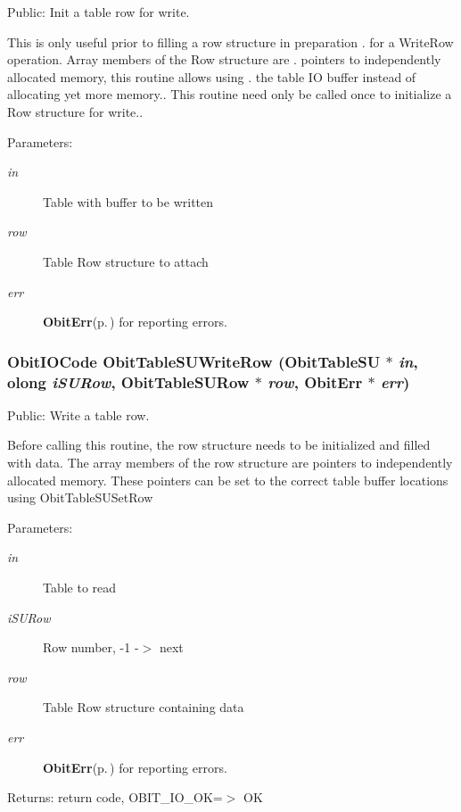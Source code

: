 Public: Init a table row for write. 

This is only useful prior to filling a row structure in preparation . for a Write\-Row operation. Array members of the Row structure are . pointers to independently allocated memory, this routine allows using . the table IO buffer instead of allocating yet more memory.. This routine need only be called once to initialize a Row structure for write.. \begin{Desc}
\item[Parameters:]
\begin{description}
\item[{\em in}]Table with buffer to be written \item[{\em row}]Table Row structure to attach \item[{\em err}]{\bf Obit\-Err}{\rm (p.\,\pageref{structObitErr})} for reporting errors. \end{description}
\end{Desc}
\subsubsection{\setlength{\rightskip}{0pt plus 5cm}Obit\-IOCode Obit\-Table\-SUWrite\-Row ({\bf Obit\-Table\-SU} $\ast$ {\em in}, {\bf olong} {\em i\-SURow}, {\bf Obit\-Table\-SURow} $\ast$ {\em row}, {\bf Obit\-Err} $\ast$ {\em err})}\label{ObitTableSU_8h_a20}


Public: Write a table row. 

Before calling this routine, the row structure needs to be initialized and filled with data. The array members of the row structure are pointers to independently allocated memory. These pointers can be set to the correct table buffer locations using Obit\-Table\-SUSet\-Row \begin{Desc}
\item[Parameters:]
\begin{description}
\item[{\em in}]Table to read \item[{\em i\-SURow}]Row number, -1 -$>$ next \item[{\em row}]Table Row structure containing data \item[{\em err}]{\bf Obit\-Err}{\rm (p.\,\pageref{structObitErr})} for reporting errors. \end{description}
\end{Desc}
\begin{Desc}
\item[Returns:]return code, OBIT\_\-IO\_\-OK=$>$ OK \end{Desc}
